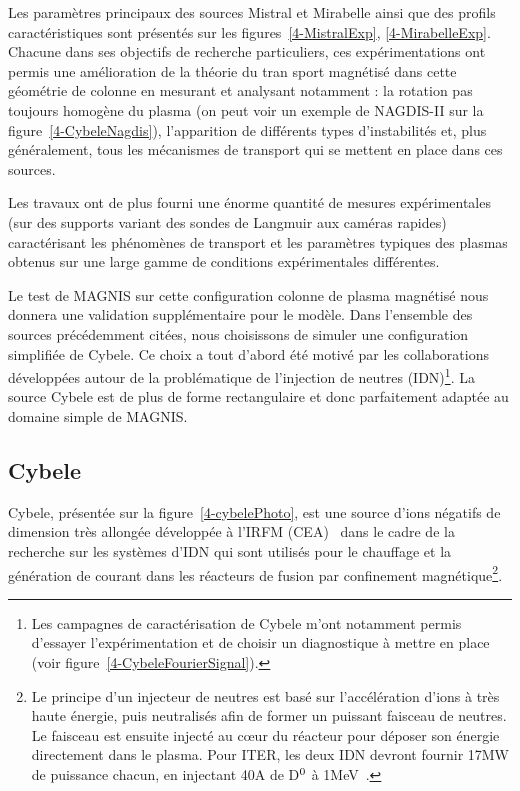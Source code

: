 \begin{refsection}
Les paramètres principaux des sources Mistral et Mirabelle ainsi que des profils
caractéristiques sont présentés sur les
figures~\ref{4-MistralExp}, \ref{4-MirabelleExp}.
Chacune dans ses objectifs de recherche particuliers, ces expérimentations
ont permis une amélioration de la théorie du tran sport magnétisé dans cette
géométrie de colonne en mesurant et analysant notamment : la rotation pas
toujours homogène du plasma (on peut voir un exemple de NAGDIS-II sur la
figure~\ref{4-CybeleNagdis}), l'apparition de différents types
d'instabilités et, plus généralement, tous les mécanismes de transport qui se mettent en place dans ces sources.

Les travaux ont de plus fourni une énorme quantité de mesures
expérimentales (sur des supports variant des sondes de Langmuir aux caméras
rapides) caractérisant les phénomènes de transport et les paramètres typiques
des plasmas obtenus sur une large gamme de conditions expérimentales différentes. 

Le test de MAGNIS sur cette configuration colonne de plasma magnétisé nous
donnera une validation supplémentaire pour le modèle. Dans l'ensemble des
sources précédemment citées, nous choisissons de simuler une configuration simplifiée de
Cybele. Ce choix a tout d'abord été motivé par les collaborations
développées autour de la problématique de l'injection
de neutres (IDN)\footnote{Les campagnes de caractérisation de Cybele m'ont
notamment permis d'essayer l'expérimentation et de choisir un diagnostique à
mettre en place (voir figure~\ref{4-CybeleFourierSignal}).}.
La source Cybele est de plus de forme rectangulaire et donc parfaitement adaptée
au domaine simple de MAGNIS.

\subsection{Cybele}

Cybele, présentée sur la figure~\ref{4-cybelePhoto}, est une
source d'ions négatifs de dimension très allongée développée à l'IRFM
(CEA)~\cite{Simonin} dans le cadre de la recherche sur les systèmes d'IDN qui sont utilisés pour le chauffage et la génération de
courant dans les réacteurs de fusion par confinement magnétique\footnote{Le principe d'un injecteur de neutres est basé sur l'accélération d'ions à très haute énergie, puis neutralisés afin de former un puissant faisceau de neutres.
Le faisceau est ensuite injecté au c\oe{}ur du réacteur pour déposer son énergie
directement dans le plasma. Pour ITER, les deux IDN devront fournir 17MW de
puissance chacun, en injectant 40A de D$^{{0}}$ à
1MeV~\parencite{Hemsworth}.}.



\end{refsection}
